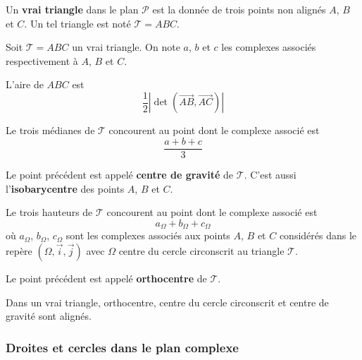 
  \begin{definition}
    Un \textbf{vrai triangle} dans le plan $\mathcal{P}$ est la donnée de trois points non alignés $A$, $B$ et $C$. Un tel triangle est noté $\mathcal{T} = ABC$.
  \end{definition}

  Soit $\mathcal{T} = ABC$ un vrai triangle. On note $a$, $b$ et $c$ les complexes associés respectivement à $A$, $B$ et $C$.

  \begin{theorem}
    L'aire de $ABC$ est
    \[ \frac{1}{2} \left| \det\left( \overrightarrow{AB}, \overrightarrow{AC} \right) \right| \]
  \end{theorem}

  \begin{proposition}
    Le trois médianes de $\mathcal{T}$ concourent au point dont le complexe associé est
    \[ \frac{a+b+c}{3} \]
  \end{proposition}

  \begin{definition}
    Le point précédent est appelé \textbf{centre de gravité} de $\mathcal{T}$. C'est aussi l'\textbf{isobarycentre} des points $A$, $B$ et $C$.
  \end{definition}

  \begin{proposition}
    Le trois hauteurs de $\mathcal{T}$ concourent au point dont le complexe associé est
    \[ a_\Omega + b_\Omega + c_\Omega \]
    où $a_\Omega$, $b_\Omega$, $c_\Omega$ sont les complexes associés aux points $A$, $B$ et $C$ considérés dans le repère $(\Omega, \overrightarrow{i}, \overrightarrow{j})$ avec $\Omega$ centre du cercle circonscrit au triangle $\mathcal{T}$.
  \end{proposition}

  \begin{definition}
    Le point précédent est appelé \textbf{orthocentre} de $\mathcal{T}$.
  \end{definition}

  \begin{proposition}
    Dans un vrai triangle, orthocentre, centre du cercle circonscrit et centre de gravité sont alignés.
  \end{proposition}

  \subsubsection{Droites et cercles dans le plan complexe}


